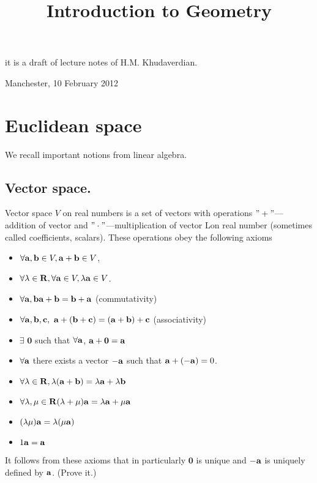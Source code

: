 \documentclass[12pt]{article}
\title{Introduction to  Geometry}
\date{}
\numberwithin{equation}{section}
\begin{document}
\maketitle

  \centerline {it is a draft of lecture notes of H.M. Khudaverdian.}

  \centerline { Manchester, 10  February  2012}

\tableofcontents

\section {Euclidean space}

We recall important notions from linear algebra.


\subsection {Vector space.}


Vector space $V$ on real numbers is a set of vectors with operations
$"+"$---addition of vector and $"\cdot"$---multiplication of vector
Lon real number (sometimes called coefficients, scalars). These
operations obey the following axioms


\begin{itemize}
 \item  $\forall {\bf a},{\bf b}\in V, {\bf a}+{\bf b}\in V$,

 \item $\forall \lambda\in {\bf R}, \forall {\bf a}\in V, \lambda {\bf a}\in V$.

\item
  $\forall {\bf a},{\bf b} {\bf a}+{\bf b}={\bf b}+{\bf a}$  (commutativity)
\item
$\forall {\bf a},{\bf b},{\bf c}, \,\,{\bf a}+({\bf b}+{\bf c})=({\bf a}+{\bf b})+{\bf c}$ (associativity)

\item  $\exists\,\, {\mathbf 0}$ such that $\forall {\bf a}$,
 ${\bf a}+{\mathbf 0}={\bf a}$

\item  $\forall {\bf a}$ there exists a vector $-{\bf a}$ such that ${\bf a}+(-{\bf a})=0$.

\item

  $\forall\lambda\in {\bf R}, \lambda({\bf a}+{\bf b})=\lambda {\bf a}+\lambda {\bf b}$

  \item

    $\forall\lambda,\mu\in {\bf R} (\lambda+\mu){\bf a}=\lambda{\bf a}+\mu{\bf a}$

    \item $(\lambda\mu){\bf a}=\lambda(\mu{\bf a})$

    \item $1{\bf a}={\bf a}$

\end{itemize}
It follows from these axioms  that in particularly $\mathbf 0$ is unique and $-{\bf a}$ is uniquely defined
by ${\bf a}$. (Prove it.)
\end{document}
